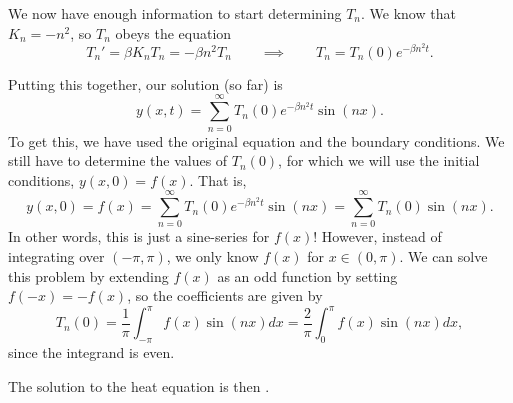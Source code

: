 \documentclass[12pt]{book}
\begin{document}
We now have enough information to start determining $T_n$. We know that
$K_n=-n^2$, so $T_n$ obeys the equation
\begin{dmath*}[compact]
  T_n' = \beta K_n T_n = - \beta n^2 T_n
  \qquad \implies \qquad
  T_n = T_n(0) e^{-\beta n^2 t}.
\end{dmath*}

Putting this together, our solution (so far) is
\begin{dmath*}
  y(x,t) = \sum_{n=0}^\infty T_n(0) e^{-\beta n^2 t} \sin(nx).
\end{dmath*}
To get this, we have used the original equation and the boundary conditions.
We still have to determine the values of $T_n(0)$, for which we will use the
initial conditions, $y(x,0)=f(x)$. That is,
\begin{dmath*}
  y(x,0)=f(x) 
  =  \sum_{n=0}^\infty T_n(0) e^{-\beta n^2 t} \sin(nx)
  = \sum_{n=0}^\infty T_n(0) \sin(nx).
\end{dmath*}
In other words, this is just a sine-series for $f(x)$! However, instead of
integrating over $(-\pi,\pi)$, we only know $f(x)$ for $x\in(0,\pi)$. We can
solve this problem by extending $f(x)$ as an odd function by setting
$f(-x)=-f(x)$, so the coefficients are given by
\begin{dmath*}
T_n(0)=\frac{1}{\pi}\int_{-\pi}^\pi f(x)\sin(nx)dx
=\frac{2}{\pi}\int_0^\pi f(x)\sin(nx)dx,
\end{dmath*}
since the integrand is even.

The solution to the heat equation is then
\be
{}.
\ee
\end{document}
